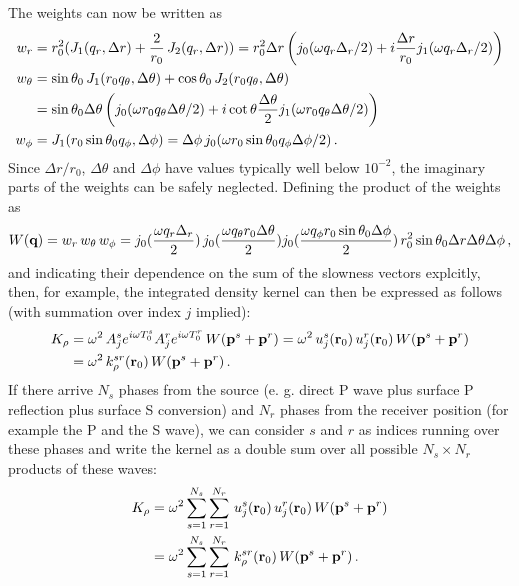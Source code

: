 The weights can now be written as
\begin{align}
   w_r &= r_0^2(J_1(q_r,\Delta r)+\frac{2}{r_0}\,J_2(q_r,\Delta r))
        = r_0^2\Delta r\left(j_0(\omega q_r\Delta_r/2)+i\frac{\Delta r}{r_0}j_1(\omega q_r\Delta_r/2)\right) \notag \\
   w_{\theta} &= \sin\theta_0\,J_1(r_0 q_\theta,\Delta\theta) +\cos\theta_0\,J_2(r_0 q_\theta,\Delta\theta) \notag \\
              &= \sin\theta_0\Delta\theta \left(j_0(\omega r_0 q_\theta\Delta\theta/2)
                 + i\cot\theta\frac{\Delta\theta}{2}j_1(\omega r_0 q_\theta\Delta\theta/2)\right) \notag \\
   w_{\phi} &= J_1(r_0\sin\theta_0 q_\phi,\Delta\phi) = \Delta\phi\,j_0(\omega r_0\sin\theta_0 q_\phi\Delta\phi/2)\,.
\end{align}
%
Since $\Delta r/r_0$, $\Delta\theta$ and $\Delta\phi$ have values typically well below $10^{-2}$, the imaginary parts of the weights can be safely neglected. Defining the product of the weights as
\begin{align}
   W(\textbf q) =  w_r\,w_\theta\,w_\phi = j_0(\frac{\omega q_r\Delta_r}{2})\,j_0(\frac{\omega q_\theta r_0\Delta\theta}{2})
               j_0(\frac{\omega q_\phi r_0\sin\theta_0\Delta\phi}{2})\,r_0^2\sin\theta_0\Delta r\Delta\theta\Delta\phi \,,
\end{align}
%
and indicating their dependence on the sum of the slowness vectors explcitly,
then, for example, the integrated density kernel can then be expressed as follows (with summation over index $j$ implied):
\begin{align}
   K_{\rho} &= \omega^2\,A^s_j e^{i\omega T^s_0} A^r_j e^{i\omega T^r_0}\,W(\textbf p^s+\textbf p^r)
             = \omega^2\,u^s_j(\textbf r_0)\,u^r_j(\textbf r_0)\,W(\textbf p^s+\textbf p^r) \notag \\
            &= \omega^2\,k^{sr}_{\rho}(\textbf r_0)\,W(\textbf p^s+\textbf p^r) \,.
\end{align}
%
If there arrive $N_s$ phases from the source (e. g. direct P wave plus surface P reflection plus surface S conversion) and $N_r$ phases from the receiver position (for example the P and the S wave), we can consider $s$ and $r$ as indices running over these phases and write the kernel as a double sum over all possible $N_s\times N_r$ products of these waves:
\begin{align}
   K_{\rho} &= \omega^2\sum_{s=1}^{N_s}\sum_{r=1}^{N_r}\,u^s_j(\textbf r_0)\,u^r_j(\textbf r_0)\,W(\textbf p^s+\textbf p^r) \notag \\
            &= \omega^2\sum_{s=1}^{N_s}\sum_{r=1}^{N_r}\,k^{sr}_{\rho}(\textbf r_0)\,W(\textbf p^s+\textbf p^r) \,.
\end{align}
